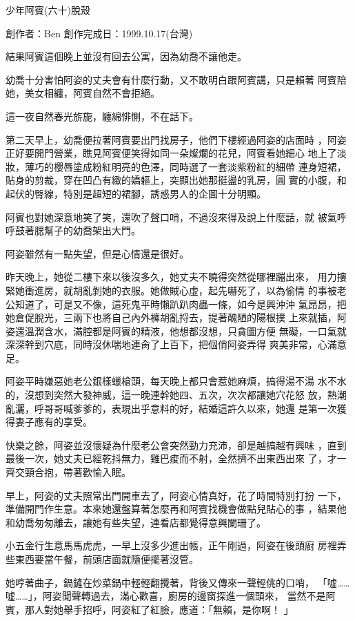 



少年阿賓(六十)脫殼

創作者：Ben
創作完成日：1999.10.17(台灣)


結果阿賓這個晚上並沒有回去公寓，因為幼喬不讓他走。

幼喬十分害怕阿姿的丈夫會有什麼行動，又不敢明白跟阿賓講，只是賴著
阿賓陪她，美女相纏，阿賓自然不會拒絕。

這一夜自然春光旂旎，纏綿悱惻，不在話下。

第二天早上，幼喬便拉著阿賓要出門找房子，他們下樓經過阿姿的店面時
，阿姿正好要開門營業，瞧見阿賓便笑得如同一朵燦爛的花兒，阿賓看她細心
地上了淡妝，薄巧的櫻唇塗成粉紅明亮的色澤，同時選了一套淡紫粉紅的細帶
連身短裙，貼身的剪裁，穿在凹凸有緻的嬌軀上，突顯出她那挺盪的乳房，圓
實的小腹，和起伏的臀線，特別是超短的裙腳，誘惑男人的企圖十分明顯。

阿賓也對她深意地笑了笑，還吹了聲口哨，不過沒來得及說上什麼話，就
被氣呼呼鼓著腮幫子的幼喬架出大門。

阿姿雖然有一點失望，但是心情還是很好。

昨天晚上，她從二樓下來以後沒多久，她丈夫不曉得突然從哪裡蹦出來，
用力摟緊她衝進房，就胡亂剝她的衣服。她做賊心虛，起先嚇死了，以為偷情
的事被老公知道了，可是又不像，這死鬼平時懶趴趴肉蟲一條，如今是興沖沖
氣昂昂，把她倉促脫光，三兩下也將自己內外褲胡亂捋去，提著醜陋的陽根撲
上來就插，阿姿還溫潤含水，滿腔都是阿賓的精液，他想都沒想，只貪圖方便
無礙，一口氣就深深幹到穴底，同時沒休喘地連肏了上百下，把個俏阿姿弄得
爽美非常，心滿意足。

阿姿平時嫌惡她老公銀樣蠟槍頭，每天晚上都只會惹她麻煩，搞得湯不湯
水不水的，沒想到突然大發神威，這一晚連幹她四、五次，次次都讓她穴花怒
放，熱潮亂灑，呼哥哥喊爹爹的，表現出乎意料的好，結婚這許久以來，她還
是第一次獲得妻子應有的享受。

快樂之餘，阿姿並沒懷疑為什麼老公會突然勁力充沛，卻是越搞越有興味
，直到最後一次，她丈夫已經乾抖無力，雞巴痠而不射，全然擠不出東西出來
了，才一齊交頸合抱，帶著歡愉入眠。

早上，阿姿的丈夫照常出門開車去了，阿姿心情真好，花了時間特別打扮
一下，準備開門作生意。本來她還盤算著怎麼再和阿賓找機會做點兒貼心的事
，結果他和幼喬匆匆離去，讓她有些失望，連看店都覺得意興闌珊了。

小五金行生意馬馬虎虎，一早上沒多少進出帳，正午剛過，阿姿在後頭廚
房裡弄些東西要當午餐，前頭店面就隨便擺著沒管。

她哼著曲子，鍋鏟在炒菜鍋中輕輕翻攪著，背後又傳來一聲輕佻的口哨，
「噓……噓……」，阿姿聞聲轉過去，滿心歡喜，廚房的邊窗探進一個頭來，
當然不是阿賓，那人對她舉手招呼，阿姿紅了紅臉，應道：「無賴，是你啊！
」

